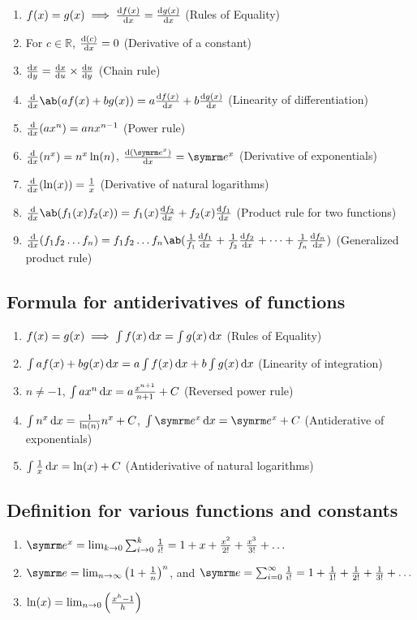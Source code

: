 \begin{enumerate}
    \item $f(x) = g(x) \implies \odv{f(x)}{x} = \odv{g(x)}{x}$ (Rules of Equality)
    \item For $c \in \mathbb{R}$, $\odv{(c)}{x} = 0$ (Derivative of a constant)
    \item $\odv{x}{y} = \odv{x}{u} \times \odv{u}{y}$ (Chain rule)
    \item $\odv*{\ab(af(x) + bg(x))}{x} = a\odv{f(x)}{x} + b\odv{g(x)}{x}$ (Linearity of differentiation)
    \item $\odv*{(ax^n)}{x} = anx^{n - 1}$ (Power rule)
    \item $\odv*{(n^x)}{x} = n^x\ln(n)$, $\odv{(\e^x)}{x} = \e^x$ (Derivative of exponentials)
    \item $\odv*{(\ln(x))}{x} = \frac{1}{x}$ (Derivative of natural logarithms)
	\item $\odv*{\ab(f_1(x)f_2(x))}{x} = f_1(x)\odv{f_2}{x} + f_2(x)\odv{f_1}{x}$ (Product rule for two functions)
	\item $\odv*{(f_1f_2\dots f_n)}{x} = f_1f_2\dots f_n\ab(\frac{1}{f_1}\odv{f_1}{x} + \frac{1}{f_2}\odv{f_2}{x} + \dots + \frac{1}{f_n}\odv{f_n}{x})$ (Generalized product rule)
\end{enumerate}

\subsection{Formula for antiderivatives of functions}

\begin{enumerate}
    \item $f(x) = g(x) \implies \int f(x)\odif{x} = \int g(x)\odif{x}$ (Rules of Equality)
    \item $\int af(x) + bg(x) \odif{x} = a\int f(x)\odif{x} + b\int g(x)\odif{x}$ (Linearity of integration)
    \item $n \neq -1$, $\int ax^n\odif{x} = a\frac{x^{n + 1}}{n + 1} + C$ (Reversed power rule)
    \item $\int n^x\odif{x} = \frac{1}{\ln(n)}n^x + C$, $\int \e^x\odif{x} = \e^x + C$ (Antiderative of exponentials)
    \item $\int \frac{1}{x}\odif{x} = \ln(x) + C$ (Antiderivative of natural logarithms)
\end{enumerate}

\subsection{Definition for various functions and constants}

\begin{enumerate}
	\item $\e^x = \lim_{k \appr 0}\sum_{i \appr 0}^{k}\frac{1}{i!} = 1 + x + \frac{x^2}{2!} + \frac{x^3}{3!} + \dots$
	\item $\e = \lim_{n \appr \infty}\left(1 + \frac{1}{n}\right)^n$, and $\e = \sum_{i = 0}^{\infty}\frac{1}{i!} = 1 + \frac{1}{1!} + \frac{1}{2!} + \frac{1}{3!} + \dots$
    \item $\ln(x) = \lim_{n \rightarrow 0}\left(\frac{x^h - 1}{h}\right)$
\end{enumerate}

\everymath{\textstyle}
